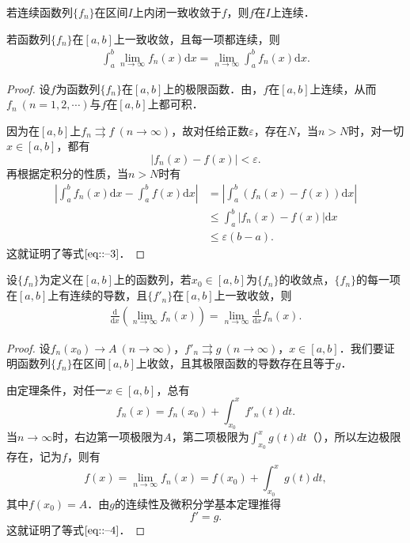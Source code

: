 \documentclass[../../main.tex]{subfiles}
\begin{document}
\begin{corollary}
若连续函数列\(\{f_n\}\)在区间\(I\)上内闭一致收敛于\(f\)，则\(f\)在\(I\)上连续．
\end{corollary}

\begin{theorem}[可积性]\label{theorem:定理13.15648640}
若函数列\(\{f_n\}\)在\([a, b]\)上一致收敛，且每一项都连续，则
\begin{align}
\int_a^b \lim_{n \to \infty} f_n(x) \mathrm{d}x = \lim_{n \to \infty} \int_a^b f_n(x) \mathrm{d}x. \label{eq::--3}
\end{align}
\end{theorem}
\begin{proof}
设\(f\)为函数列\(\{f_n\}\)在\([a, b]\)上的极限函数．由，\(f\)在\([a, b]\)上连续，从而\(f_n \ (n = 1, 2, \cdots)\)与\(f\)在\([a, b]\)上都可积．

因为在\([a, b]\)上\(f_n \rightrightarrows f \ (n \to \infty)\)，故对任给正数\(\varepsilon\)，存在\(N\)，当\(n > N\)时，对一切\(x \in [a, b]\)，都有
\[
|f_n(x) - f(x)| < \varepsilon.
\]
再根据定积分的性质，当\(n > N\)时有
\begin{align*}
\left| \int_a^b f_n(x) \mathrm{d}x - \int_a^b f(x) \mathrm{d}x \right| &= \left| \int_a^b (f_n(x) - f(x)) \mathrm{d}x \right| \\
&\leqslant \int_a^b |f_n(x) - f(x)| \mathrm{d}x \\
&\leqslant \varepsilon(b - a).
\end{align*}
这就证明了等式\(\eqref{eq::--3}\)．
\end{proof}

\begin{theorem}[可微性]\label{theorem:定理13.1154661}
设\(\{f_n\}\)为定义在\([a, b]\)上的函数列，若\(x_0 \in [a, b]\)为\(\{f_n\}\)的收敛点，\(\{f_n\}\)的每一项在\([a, b]\)上有连续的导数，且\(\{f'_n\}\)在\([a, b]\)上一致收敛，则
\begin{align}
\frac{\mathrm{d}}{\mathrm{d}x} \left( \lim_{n \to \infty} f_n(x) \right) = \lim_{n \to \infty} \frac{\mathrm{d}}{\mathrm{d}x} f_n(x). \label{eq::--4}
\end{align}
\end{theorem}
\begin{proof}
设\(f_n(x_0) \to A \ (n \to \infty)\)，\(f'_n \rightrightarrows g \ (n \to \infty)\)，\(x \in [a, b]\)．我们要证明函数列\(\{f_n\}\)在区间\([a, b]\)上收敛，且其极限函数的导数存在且等于\(g\)．

由定理条件，对任一\(x \in [a, b]\)，总有
\[
f_n(x) = f_n(x_0) + \int_{x_0}^x f'_n(t) dt.
\]
当\(n \to \infty\)时，右边第一项极限为\(A\)，第二项极限为\(\int_{x_0}^x g(t) dt\)（），所以左边极限存在，记为\(f\)，则有
\[
f(x) = \lim_{n \to \infty} f_n(x) = f(x_0) + \int_{x_0}^x g(t) dt,
\]
其中\(f(x_0) = A\)．由\(g\)的连续性及微积分学基本定理推得
\[
f' = g.
\]
这就证明了等式\(\eqref{eq::--4}\)．
\end{proof}
\end{document}
